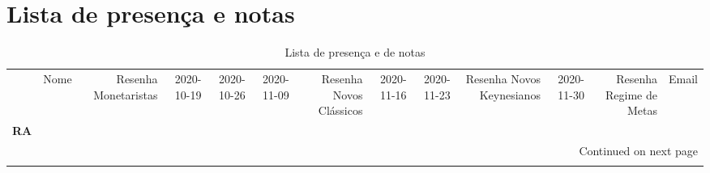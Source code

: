 \documentclass[11pt]{article}
\begin{document}
\section{Lista de presença e notas}
\label{sec:org900b43d}
\begin{center}\begin{landscape}
\small
\setlength\LTleft{0pt}
\setlength\LTright{0pt}
\begin{longtable}{llrrrrrrrrrrl}
\caption{Lista de presença e de notas}\label{lista}\\
\toprule
{} &                                  Nome &  Resenha Monetaristas &  2020-10-19 &  2020-10-26 &  2020-11-09 &  Resenha Novos Clássicos &  2020-11-16 &  2020-11-23 &  Resenha Novos Keynesianos &  2020-11-30 &  Resenha Regime de Metas &                   Email \\
\textbf{RA    } &                                       &                       &             &             &             &                          &             &             &                            &             &                          &                         \\
\midrule
\endhead
\midrule
\multicolumn{13}{r}{{Continued on next page}} \\
\midrule
\endfoot


\end{longtable}
\end{landscape}
\end{center}
\end{document}
